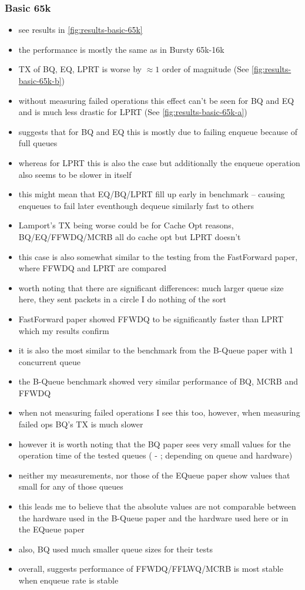 \subsubsection{Basic 65k}
\begin{itemize}
    \item see results in \autoref{fig:results-basic-65k}
    \item the performance is mostly the same as in Bursty 65k-16k
    \item TX of BQ, EQ, LPRT is worse by $\approx 1$ order of magnitude (See \autoref{fig:results-basic-65k-b})
    \item without measuring failed operations this effect can't be seen for BQ and EQ and is much less
        drastic for LPRT (See \autoref{fig:results-basic-65k-a})
    \item suggests that for BQ and EQ this is mostly due to failing enqueue because of full queues
    \item whereas for LPRT this is also the case but additionally the enqueue operation also seems to be slower in itself
    \item this might mean that EQ/BQ/LPRT fill up early in benchmark -- causing enqueues to fail later eventhough dequeue similarly fast to others
    \item Lamport's TX being worse could be for Cache Opt reasons, BQ/EQ/FFWDQ/MCRB all do cache opt but LPRT doesn't
    \item this case is also somewhat similar to the testing from the FastForward paper, where FFWDQ and LPRT are compared
    \item worth noting that there are significant differences: much larger queue size here, they sent packets in a circle I do nothing of the sort
    \item FastForward paper showed FFWDQ to be significantly faster than LPRT which my results confirm
    \item it is also the most similar to the benchmark from the B-Queue paper with 1 concurrent queue
    \item the B-Queue benchmark showed very similar performance of BQ, MCRB and FFWDQ
    \item when not measuring failed operations I see this too, however, when measuring failed ops BQ's TX is much slower
    \item however it is worth noting that the BQ paper sees very small values for the operation time of the tested queues ( - ; depending on queue and hardware)
    \item neither my measurements, nor those of the EQueue paper show values that small for any of those queues
    \item this leads me to believe that the absolute values are not comparable between the hardware used in the B-Queue paper and the hardware used here or in the EQueue paper
    \item also, BQ used much smaller queue sizes for their tests
    \item overall, suggests performance of FFWDQ/FFLWQ/MCRB is most stable when enqueue rate is stable
\end{itemize}
